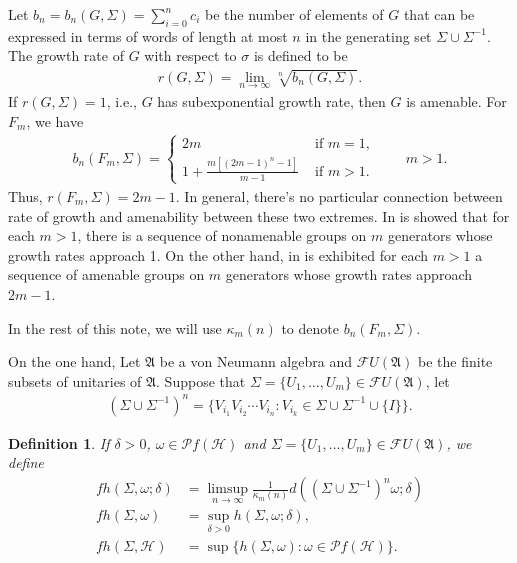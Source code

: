 \documentclass[a4paper,10pt]{amsart}
\newtheorem{definition}{Definition}[section]
\newcommand{\AAA}{\mathfrak A}
\newcommand{\HHH}{\mathscr H} %
\newcommand{\PP}{\mathscr P}
\newcommand{\FF}{\mathscr F}
\begin{document}
Let $b_n = b_n(G, \Sigma) = \sum^{n}_{i=0}c_i$ be the number of elements 
of $G$ that
can be expressed in terms of words of length at most $n$ in the 
generating set $\Sigma \cup \Sigma^{-1}$.
The growth rate of $G$ with respect to $\sigma$ is defined to be
\begin{align*}
    r(G, \Sigma) = \lim_{n \rightarrow \infty} \sqrt[n]{b_n (G, \Sigma)}. 
\end{align*}
If $r(G, \Sigma)=1$, i.e., $G$ has subexponential growth rate, 
then $G$ is amenable. For $F_m$, we have
\begin{align*}
    b_n(F_m, \Sigma) = 
   \begin{cases}
       2m  & \mbox{ if $m =1$},\\
       1+ \frac{m[(2m-1)^{n} -1]}{m-1} &\mbox{ if $m>1$}.
    \end{cases}
    \qquad m > 1.
\end{align*}
Thus, $r(F_{m}, \Sigma) = 2m-1$. 
In general, there's no particular connection between rate of growth and amenability 
between these two extremes. In \cite{AGG} is showed that for each $m>1$,
there is a sequence of nonamenable groups on $m$ generators whose growth rates 
approach 1. On the other hand, in \cite{Gl} is exhibited for each $m>1$ 
a sequence of amenable groups on $m$ generators whose growth rates approach $2m-1$.


In the rest of this note, we will use $\kappa_m(n)$ to denote 
$b_n(F_m, \Sigma)$.


On the one hand, Let $\AAA$ be a von Neumann algebra and $\FF U(\AAA)$ be the finite 
subsets of unitaries of $\AAA$. Suppose that $\Sigma = 
 \{U_1, \ldots, U_m \}\in \FF U(\AAA)$, let
\begin{align*}
    (\Sigma \cup \Sigma^{-1})^n= \{V_{i_1}V_{i_2}\cdots V_{i_n}: V_{i_k} \in \Sigma 
    \cup \Sigma^{-1} \cup \{I\} \}.
\end{align*}

\begin{definition}
    If $\delta > 0$, $\omega \in \PP f(\HHH)$ and 
    $\Sigma = \{U_1, \ldots, U_m \} \in 
    \FF U(\AAA)$, we define
    \begin{align*}
        fh(\Sigma,\omega; \delta) &=
           \limsup\limits_{n \rightarrow \infty}
           \frac{1}{\kappa_{m}(n)}d\left 
           ((\Sigma \cup \Sigma^{-1})^{n}\omega
            ; \delta \right ) \\
        fh(\Sigma, \omega) &= \sup_{\delta > 0}h(\Sigma, \omega; \delta),\\
        fh(\Sigma, \HHH) &= \sup\{h(\Sigma, \omega): \omega \in \PP f(\HHH)\}.
    \end{align*}
\end{definition}
\end{document}
